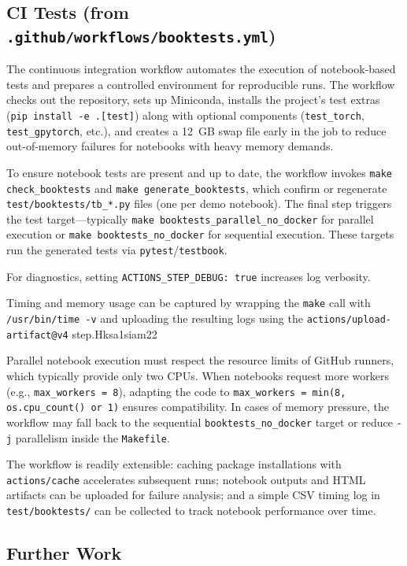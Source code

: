 \subsection{CI Tests (from \texttt{.github/workflows/booktests.yml})}

The continuous integration workflow automates the execution of notebook-based
tests and prepares a controlled environment for reproducible runs. The workflow
checks out the repository, sets up Miniconda, installs the project’s test
extras (\texttt{pip install -e .[test]}) along with optional components
(\texttt{test\_torch}, \texttt{test\_gpytorch}, etc.), and creates a 12~GB swap
file early in the job to reduce out-of-memory failures for notebooks with heavy
memory demands.

To ensure notebook tests are present and up to date, the workflow invokes
\texttt{make check\_booktests} and \texttt{make generate\_booktests}, which
confirm or regenerate \texttt{test/booktests/tb\_*.py} files (one per demo
notebook). The final step triggers the test target---typically
\texttt{make booktests\_parallel\_no\_docker} for parallel execution or
\texttt{make booktests\_no\_docker} for sequential execution. These targets run
the generated tests via \texttt{pytest}/\texttt{testbook}.

For diagnostics, setting \texttt{ACTIONS\_STEP\_DEBUG: true} increases log
verbosity. 

Timing and memory usage can be captured by wrapping the \texttt{make} call with
\texttt{/usr/bin/time -v} and uploading the resulting logs using the
\texttt{actions/upload-artifact@v4} step.Hksa1siam22

Parallel notebook execution must respect the resource limits of GitHub
runners, which typically provide only two CPUs. When notebooks request more
workers (e.g., \texttt{max\_workers = 8}), adapting the code to
\texttt{max\_workers = min(8, os.cpu\_count() or 1)} ensures compatibility. In
cases of memory pressure, the workflow may fall back to the sequential
\texttt{booktests\_no\_docker} target or reduce \texttt{-j} parallelism inside
the \texttt{Makefile}.

The workflow is readily extensible: caching package installations with
\texttt{actions/cache} accelerates subsequent runs; notebook outputs and HTML
artifacts can be uploaded for failure analysis; and a simple CSV timing log in
\texttt{test/booktests/} can be collected to track notebook performance over
time.


\subsection{Further Work}

